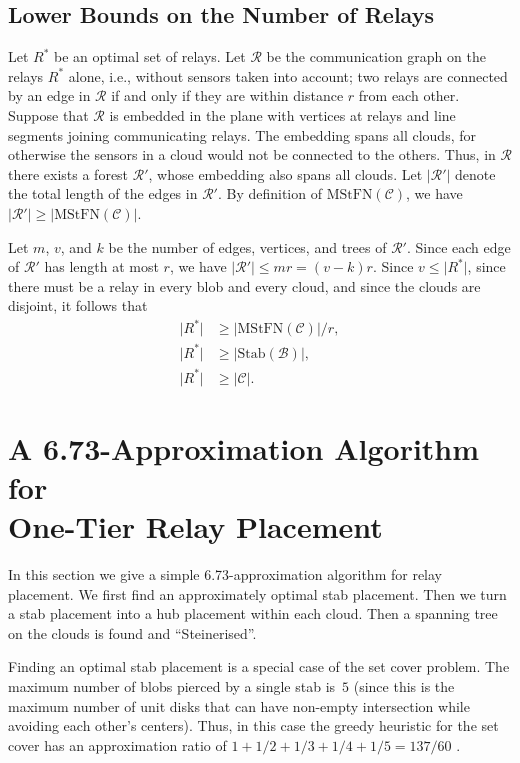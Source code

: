\documentclass[11pt,a4paper]{article}
\newcommand{\s}[1]{{\lvert #1 \rvert}}
\newcommand{\myB}{\mathcal{B}} \newcommand{\myC}{\mathcal{C}} \newcommand{\myD}{\mathcal{D}} \newcommand{\myP}{\mathcal{P}} \newcommand{\myS}{\mathcal{S}}
\newcommand{\myR}{\mathcal{R}}
\newcommand{\MStTN}{\mathrm{MStFN}}
\newcommand{\optstab}{\mathrm{Stab}}
\newcommand{\optrel}{R^{*}}
\newcommand{\rstabt}{137/60}
\theoremstyle{definition}
\theoremstyle{remark}
\newcommand{\mytitlebreak}{\texorpdfstring{\\}{ }}
\begin{document}
\subsection{Lower Bounds on the Number of Relays}\label{ssec:lower-bounds}

Let $\optrel$ be an optimal set of relays.  Let $\myR$ be the communication graph on the relays $\optrel$ alone, i.e., without sensors taken into account; two relays are connected by an edge in $\myR$ if and only if they are within distance $r$ from each other. Suppose that $\myR$ is embedded in the plane with vertices at relays and line segments joining communicating relays.  The embedding spans all clouds, for otherwise the sensors in a cloud would not be connected to the others. Thus, in $\myR$ there exists a forest $\myR'$, whose embedding also spans all clouds. Let $\s{\myR'}$ denote the total length of the edges in $\myR'$. By definition of $\MStTN(\myC)$, we have $\s{\myR'} \ge \s{\MStTN(\myC)}$.

Let $m$, $v$, and $k$ be the number of edges, vertices, and trees of $\myR'$.  Since each edge of $\myR'$ has length at most $r$, we have $\s{\myR'} \le m r = (v - k) r$. Since $v \le \s{\optrel}$, since there must be a relay in every blob and every cloud, and since the clouds are disjoint, it follows that
\begin{align}
    \s{\optrel} &\ge \s{\MStTN(\myC)} / r, \label{eq_lower_bound_MStTN}\\
    \s{\optrel} &\ge \s{\optstab(\myB)}, \label{eq_lower_bound_Stab}\\
    \s{\optrel} &\ge \s{\myC}. \label{eq_lower_bound_C}
\end{align}



\section{A 6.73-Approximation Algorithm for\mytitlebreak One-Tier Relay Placement}\label{sec_apx1tier}

In this section we give a simple 6.73-approximation algorithm for relay placement.  We first find an approximately optimal stab placement. Then we turn a stab placement into a hub placement within each cloud. Then a spanning tree on the clouds is found and ``Steinerised''.

Finding an optimal stab placement is a special case of the set cover problem. The maximum number of blobs pierced by a single stab is~$5$ (since this is the maximum number of unit disks that can have non-empty intersection while avoiding each other's centers). Thus, in this case the greedy heuristic for the set cover has an approximation ratio of $1+1/2+1/3+1/4+1/5=\rstabt$ \cite[Theorem~35.4]{cormen01introduction}.
\end{document}

